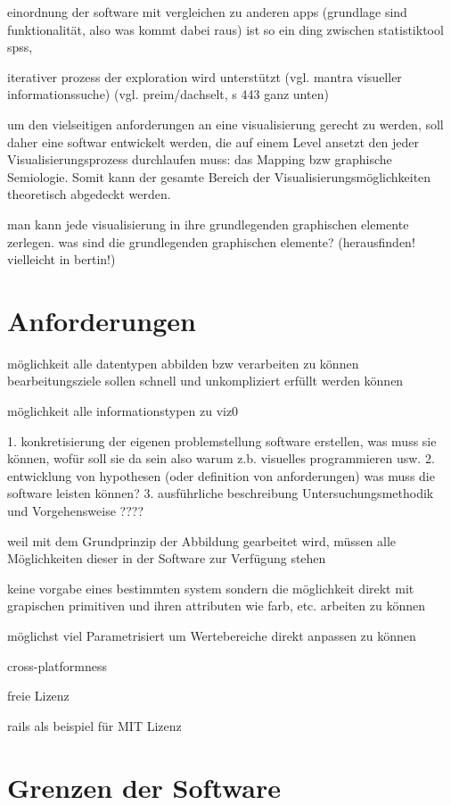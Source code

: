 \documentclass[a4paper, 12pt, DIVcalc, onepage, pdftex, headsepline, footsepline]{scrreprt}
\begin{document}
einordnung der software mit vergleichen zu anderen apps (grundlage sind funktionalität, also was kommt dabei raus) ist so ein ding zwischen statistiktool spss, 

iterativer prozess der exploration wird unterstützt (vgl. mantra visueller informationssuche) (vgl. preim/dachselt, s 443 ganz unten)

um den vielseitigen anforderungen an eine visualisierung gerecht zu werden, soll daher eine softwar entwickelt werden, die auf einem Level ansetzt den jeder Visualisierungsprozess durchlaufen muss: das Mapping bzw graphische Semiologie. Somit kann der gesamte Bereich der Visualisierungsmöglichkeiten theoretisch abgedeckt werden.

man kann jede visualisierung in ihre grundlegenden graphischen elemente zerlegen.
was sind die grundlegenden graphischen elemente? (herausfinden! vielleicht in bertin!)
\section{Anforderungen}
\label{sec:Anforderungen}
möglichkeit alle datentypen abbilden bzw verarbeiten zu können
bearbeitungsziele sollen schnell und unkompliziert erfüllt werden können

möglichkeit alle informationstypen zu viz0

1. konkretisierung der eigenen problemstellung
software erstellen, was muss sie können, wofür soll sie da sein
also warum z.b. visuelles programmieren usw.
2. entwicklung von hypothesen (oder definition von anforderungen)
was muss die software leisten können?
3. ausführliche beschreibung Untersuchungsmethodik und Vorgehensweise
????

weil mit dem Grundprinzip der Abbildung gearbeitet wird, müssen alle Möglichkeiten dieser in der Software zur Verfügung stehen

keine vorgabe eines bestimmten system sondern die möglichkeit direkt mit grapischen primitiven und ihren attributen wie farb, etc. arbeiten zu können

möglichst viel Parametrisiert um Wertebereiche direkt anpassen zu können

cross-platformness

freie Lizenz

rails als beispiel für MIT Lizenz

\section{Grenzen der Software}
\label{sec:Grenzen}
\end{document}
